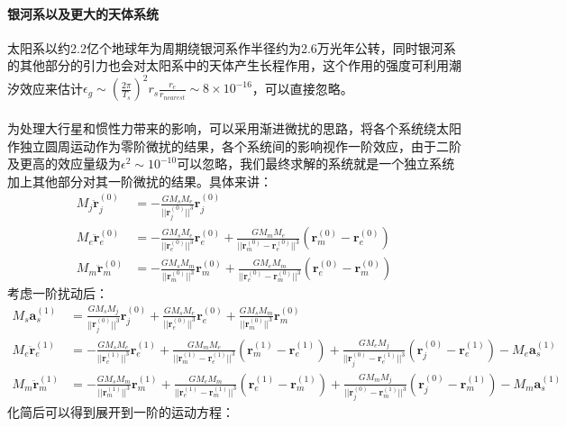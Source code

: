 \documentclass[hidelinks]{article}
\begin{document}
\paragraph{银河系以及更大的天体系统}
太阳系以约2.2亿个地球年为周期绕银河系作半径约为2.6万光年公转，同时银河系的其他部分的引力也会对太阳系中的天体产生长程作用，这个作用的强度可利用潮汐效应来估计$\epsilon_g\sim(\frac{2\pi}{T_s})^2r_s\frac{r_e}{r_{nearest}}\sim8\times10^{-16}$，可以直接忽略。
\\
\\
为处理大行星和惯性力带来的影响，可以采用渐进微扰的思路，将各个系统绕太阳作独立圆周运动作为零阶微扰的结果，各个系统间的影响视作一阶效应，由于二阶及更高的效应量级为$\epsilon^2\sim10^{-10}$可以忽略，我们最终求解的系统就是一个独立系统加上其他部分对其一阶微扰的结果。具体来讲：
\begin{align*}
    M_j\ddot{\mathbf{r}}_j^{(0)}&=-\frac{GM_sM_e}{||\mathbf{r}_j^{(0)}||^3}\mathbf{r}_j^{(0)}\\
    M_e\ddot{\mathbf{r}}_e^{(0)}&=-\frac{GM_sM_e}{||\mathbf{r}_e^{(0)}||^3}\mathbf{r}_e^{(0)}+\frac{GM_mM_e}{||\mathbf{r}_m^{(0)}-\mathbf{r}_e^{(0)}||^3}(\mathbf{r}_m^{(0)}-\mathbf{r}_e^{(0)})\\   
    M_m\ddot{\mathbf{r}}_m^{(0)}&=-\frac{GM_sM_m}{||\mathbf{r}_m^{(0)}||^3}\mathbf{r}_m^{(0)}+\frac{GM_eM_m}{||\mathbf{r}_e^{(0)}-\mathbf{r}_m^{(0)}||^3}(\mathbf{r}_e^{(0)}-\mathbf{r}_m^{(0)})
\end{align*}
考虑一阶扰动后：
\begin{align*}
    M_s\mathbf{a}_s^{(1)}&=\frac{GM_sM_j}{||\mathbf{r}_j^{(0)}||^3}\mathbf{r}_j^{(0)}+\frac{GM_sM_e}{||\mathbf{r}_e^{(0)}||^3}\mathbf{r}_e^{(0)}+\frac{GM_sM_m}{||\mathbf{r}_m^{(0)}||^3}\mathbf{r}_m^{(0)}\\
    M_e\ddot{\mathbf{r}}_e^{(1)}&=-\frac{GM_sM_e}{||\mathbf{r}_e^{(1)}||^3}\mathbf{r}_e^{(1)}+\frac{GM_mM_e}{||\mathbf{r}_m^{(1)}-\mathbf{r}_e^{(1)}||^3}(\mathbf{r}_m^{(1)}-\mathbf{r}_e^{(1)})+\frac{GM_eM_j}{||\mathbf{r}_j^{(0)}-\mathbf{r}_e^{(1)}||^3}(\mathbf{r}_j^{(0)}-\mathbf{r}_e^{(1)})-M_e\mathbf{a}_s^{(1)}\\
    M_m\ddot{\mathbf{r}}_m^{(1)}&=-\frac{GM_sM_m}{||\mathbf{r}_m^{(1)}||^3}\mathbf{r}_m^{(1)}+\frac{GM_eM_m}{||\mathbf{r}_e^{(1)}-\mathbf{r}_m^{(1)}||^3}(\mathbf{r}_e^{(1)}-\mathbf{r}_m^{(1)})+\frac{GM_mM_j}{||\mathbf{r}_j^{(0)}-\mathbf{r}_m^{(1)}||^3}(\mathbf{r}_j^{(0)}-\mathbf{r}_m^{(1)})-M_m\mathbf{a}_s^{(1)}
\end{align*}
化简后可以得到展开到一阶的运动方程：
\end{document}
